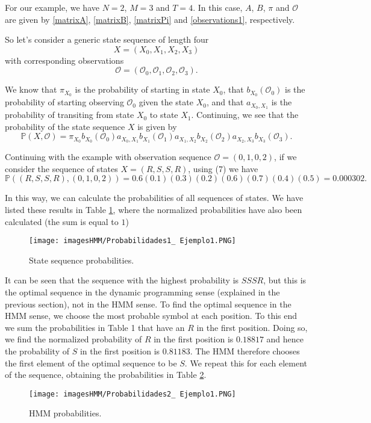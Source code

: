 \documentclass[12pt]{article}
\def\OO{\mathcal{O}}
\def\PP{\mathbb{P}}
\numberwithin{equation}{section}
\begin{document}
For our example, we have $N = 2$, $M = 3$ and $T = 4$. In this case, $A$, $B$, $\pi$ and $\OO$ are given by \ref{matrixA}, \ref{matrixB}, \ref{matrixPi} and \ref{observations1}, respectively.

So let's consider a generic state sequence of length four
\[X = (X_{0}, X_{1}, X_{2}, X_{3})\]
with corresponding observations
\[\OO = ( \OO_{0}, \OO_{1}, \OO_{2}, \OO_{3}).\]

We know that $\pi_{X_{0}}$ is the probability of starting in state $X_{0}$, that $b_{X_{0}}(\OO_{0})$ is the probability of starting observing $\OO_{0}$ given the state $X_{0}$, and that $a_{X_{0}, X_{1}}$ is the probability of transiting from state $X_{0}$ to state $X_{1}$. Continuing, we see that the probability of the state sequence $X$ is given by
\begin{equation}\label{P(X,O) ejemplo}
\PP(X,\OO) = \pi_{X_{0}} b_{X_{0}}(\OO_{0}) a_{X_{0}, X_{1}} b_{X_{1}}(\OO_{1}) a_{X_{1}, X_{2}} b_{X_{2}}(\OO_{2}) a_{X_{2}, X_{3}} b_{X_{3}}(\OO_{3}).
\end{equation}

Continuing with the example with observation sequence $\OO = (0, 1, 0, 2)$, if we consider the sequence of states $X = (R, S, S, R)$, using (7) we have
\[\PP((R,S,S,R),(0,1,0,2)) = 0.6 (0.1) (0.3) (0.2) (0.6) (0.7) (0.4) (0.5) = 0.000302.\]

In this way, we can calculate the probabilities of all sequences of states. We have listed these results in Table \ref{figure:Probabilidades1 Ejemplo1}, where the normalized probabilities have also been calculated (the sum is equal to $1$)
\begin{figure}[H]
\centering
\texttt{[image: imagesHMM/Probabilidades1\_ Ejemplo1.PNG]}
\caption{State sequence probabilities.\label{figure:Probabilidades1 Ejemplo1}}
\end{figure}

It can be seen that the sequence with the highest probability is $SSSR$, but this is the optimal sequence in the dynamic programming sense (explained in the previous section), not in the HMM sense. To find the optimal sequence in the HMM sense, we choose the most probable symbol at each position. To this end we sum the probabilities in Table 1 that have an $R$ in the first position. Doing so, we find the normalized probability of $R$ in the first position is $0.18817$ and hence the probability of $S$ in the first position is $0.81183$. The HMM therefore chooses the first element of the optimal sequence to be $S$. We repeat this for each element of the sequence, obtaining the probabilities in Table \ref{figure:Probabilidades2 Ejemplo1}.
\begin{figure}[H]
\centering
\texttt{[image: imagesHMM/Probabilidades2\_ Ejemplo1.PNG]}
\caption{HMM probabilities.\label{figure:Probabilidades2 Ejemplo1}}
\end{figure}
\end{document}
